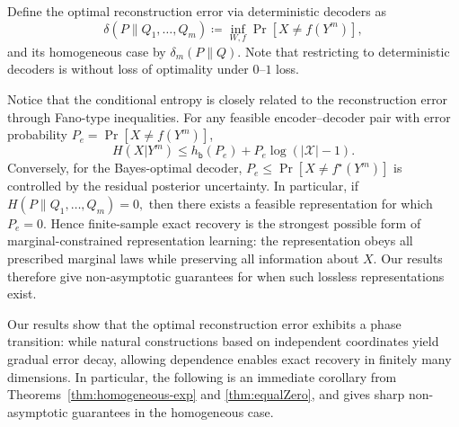 \documentclass[journal]{IEEEtran}
\def\calX{{\mathcal X}}
\newcommand{\1}{\mathbf{1}}
\begin{document}
 
Define the optimal reconstruction error via deterministic decoders as
$$\delta(P\|Q_1,\dots,Q_m)\coloneqq \inf_{W,f} \Pr[X\neq f(Y^m)],$$
and its homogeneous case by $\delta_m(P\|Q)$. 
Note that restricting to deterministic decoders is without loss of optimality under $0$--$1$ loss. 

Notice that the conditional entropy is closely related to the reconstruction error through Fano-type inequalities. For any feasible encoder--decoder pair with error probability $P_e=\Pr[X\neq f(Y^m)]$,
\[H(X| Y^m)\le h_{\mathsf b}(P_e)+P_e\log(|\calX|-1).\]
Conversely, for the Bayes-optimal decoder,
\(P_e\le\Pr[X\neq f^\star(Y^m)]\) is controlled by the residual posterior uncertainty. In particular, if \(H(P\|Q_1,\dots,Q_m)=0,\)
then there exists a feasible representation for which $P_e=0$. Hence finite-sample exact recovery is the strongest possible form of marginal-constrained representation learning: the representation obeys all prescribed marginal laws while preserving all information about $X$.
Our results therefore give non-asymptotic guarantees for when such lossless representations exist.


Our results show that the optimal reconstruction error exhibits a phase transition: while natural constructions based on independent coordinates yield gradual error decay, allowing dependence enables exact recovery in finitely many dimensions. In particular, the following is an  immediate corollary from Theorems~\ref{thm:homogeneous-exp} and \ref{thm:equalZero}, and gives sharp non-asymptotic guarantees in the homogeneous case.
\end{document}
